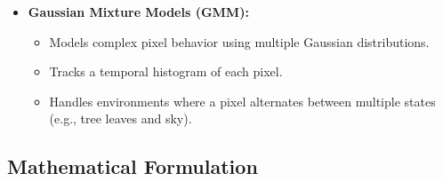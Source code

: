 \documentclass[12pt]{article}
\begin{document}
\begin{itemize}
\begin{itemize}
              \item \textbf{Gaussian Mixture Models (GMM):}
                    \begin{itemize}
                        \item Models complex pixel behavior using multiple Gaussian distributions.
                        \item Tracks a temporal histogram of each pixel.
                        \item Handles environments where a pixel alternates between multiple states (e.g., tree leaves and sky).
                    \end{itemize}
          \end{itemize}
\end{itemize}

\subsection{Mathematical Formulation}
\end{document}
